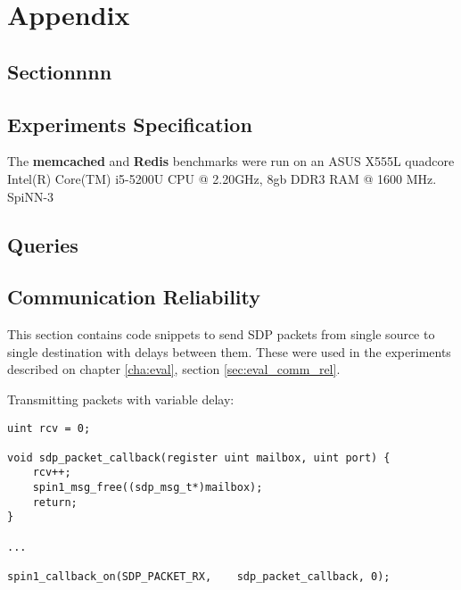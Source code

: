 \chapter{Appendix}

\section{Sectionnnn}





\section{Experiments Specification}
\label{sec:appendix-specs}

The \textbf{memcached} and \textbf{Redis} benchmarks were run on an ASUS X555L quadcore Intel(R) Core(TM) i5-5200U CPU @ 2.20GHz, 8gb DDR3 RAM @ 1600 MHz. SpiNN-3

\section{Queries}
\label{sec:appendix-queries}



\section{Communication Reliability}
\label{sec:appendix_comm_rel}

This section contains code snippets to send SDP packets from single source to single destination with delays between them. These were used in the experiments described on chapter \ref{cha:eval}, section \ref{sec:eval_comm_rel}.

Transmitting packets with variable delay:

\begin{lstlisting}[caption={Source}]
uint rcv = 0;

void sdp_packet_callback(register uint mailbox, uint port) {
    rcv++;
    spin1_msg_free((sdp_msg_t*)mailbox);
    return;
}

...

spin1_callback_on(SDP_PACKET_RX,    sdp_packet_callback, 0);

\end{lstlisting}


